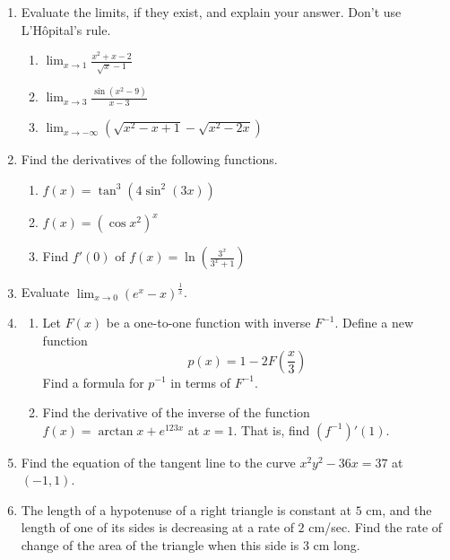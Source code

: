 \documentclass[a4paper, 12pt]{article}
\begin{document}
\begin{enumerate}[leftmargin=*,label=\textbf{\arabic*.}]
\item Evaluate the limits, if they exist, and explain your answer. Don't use L'Hôpital's rule.

\begin{enumerate}[leftmargin=*,label=\textbf{\alph*.}]
\item $\displaystyle \lim_{x\to 1} \frac{x^2+x-2}{\sqrt x-1}$
\item $\displaystyle \lim_{x\to 3} \frac{\sin(x^2-9)}{x-3}$
\item $\displaystyle \lim_{x\to -\infty}\left(\sqrt{x^2-x+1}-\sqrt{x^2-2x}\right)$
\end{enumerate}

\item Find the derivatives of the following functions.

\begin{enumerate}[leftmargin=*,label=\textbf{\alph*.}]
\item $\displaystyle f(x) = \tan^3\left(4\sin^2(3x)\right)$
\item $\displaystyle f(x) = \left(\cos x^2\right)^x$
\item Find $f'(0)$ of $\displaystyle f(x)=\ln\left(\frac{3^x}{3^x+1}\right)$
\end{enumerate}

\item Evaluate $\displaystyle \lim_{x\to0}\left( e^x-x\right)^{\frac1x}$.

\item
\begin{enumerate}[leftmargin=*,label=\textbf{\alph*.}]
\item Let $F(x)$ be a one-to-one function with inverse $F^{-1}$. Define a new function
\[p(x) = 1-2F\left(\frac x3\right)\]
Find a formula for $p^{-1}$ in terms of $F^{-1}$.
\item Find the derivative of the inverse of the function $f(x) = \arctan x +  e^{123x}$ at $x=1$. That is, find $\left(f^{-1}\right)'(1)$.
\end{enumerate}

\item Find the equation of the tangent line to the curve $x^2y^2-36x=37$ at $(-1, 1)$.

\item The length of a hypotenuse of a right triangle is constant at $5$ cm, and the
length of one of its sides is decreasing at a rate of $2$ cm/sec. Find the rate of change of the area of the triangle when this side is $3$ cm long.
\end{enumerate}
\end{document}
